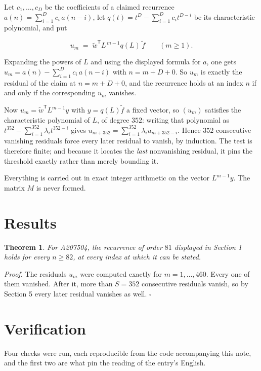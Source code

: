\documentclass[11pt]{article}
\newtheorem{theorem}{Theorem}
\theoremstyle{definition}
\begin{document}
Let $c_1,\dots,c_D$ be the coefficients of a claimed recurrence $a(n) = \sum_{i=1}^{D} c_i\,a(n-i)$, let $q(t) = t^{D} - \sum_{i=1}^{D} c_i t^{D-i}$ be its characteristic polynomial, and put

\[u_m \;=\; \tilde w^{\mathsf T} L^{\,m-1} q(L)\,\tilde f \qquad (m \ge 1).\]

Expanding the powers of $L$ and using the displayed formula for $a$, one gets $u_m = a(n) - \sum_{i=1}^{D} c_i\,a(n-i)$ with $n = m + D + 0$. So $u_m$ is exactly the residual of the claim at $n = m + D + 0$, and the recurrence holds at an index $n$ if and only if the corresponding $u_m$ vanishes.

Now $u_m = \tilde w^{\mathsf T} L^{m-1} y$ with $y = q(L)\tilde f$ a fixed vector, so $(u_m)$ satisfies the characteristic polynomial of $L$, of degree $352$: writing that polynomial as $t^{352} - \sum_{i=1}^{352} \lambda_i t^{352-i}$ gives $u_{m+352} = \sum_{i=1}^{352} \lambda_i u_{m+352-i}$. Hence $352$ consecutive vanishing residuals force every later residual to vanish, by induction. The test is therefore finite; and because it locates the {\itshape last} nonvanishing residual, it pins the threshold exactly rather than merely bounding it.

Everything is carried out in exact integer arithmetic on the vector $L^{m-1}y$. The matrix $M$ is never formed.

\section{Results}

\begin{theorem} For A207504, the recurrence of order $81$ displayed in Section 1 holds for every $n \ge 82$, at every index at which it can be stated.\end{theorem}

{\itshape Proof.} The residuals $u_m$ were computed exactly for $m = 1,\dots,460$. Every one of them vanished. After it, more than $S = 352$ consecutive residuals vanish, so by Section 5 every later residual vanishes as well. $\square$

\section{Verification}

Four checks were run, each reproducible from the code accompanying this note, and the first two are what pin the reading of the entry's English.
\end{document}

